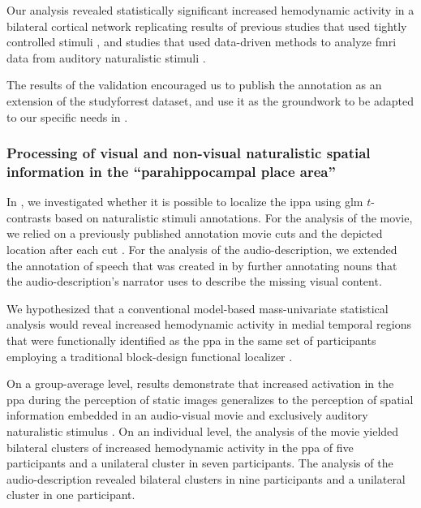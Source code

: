 
Our analysis revealed statistically significant increased hemodynamic activity
in a bilateral cortical network replicating results of previous studies that
used tightly controlled stimuli \citep[s.][for reviews]{friederici2011brain,
hickok2007cortical,price2012twentyyears}, and studies that used data-driven
methods to analyze \ac{fmri} data from auditory naturalistic stimuli
\citep{honey2012not, lerner2011topographic, silbert2014coupled}.

The results of the validation encouraged us to publish the annotation as an
extension of the studyforrest dataset, and use it as the groundwork to be
adapted to our specific needs in \citet{haeusler2022processing}.



\subsubsection{Processing of visual and non-visual naturalistic spatial
information in the ``parahippocampal place area''}


In \citet{haeusler2022processing}, we investigated whether it is possible to
localize the i\ac{ppa} using \ac{glm} $t$-contrasts based on naturalistic
stimuli annotations.
For the analysis of the movie, we relied on a previously published annotation
movie cuts and the depicted location after each cut \citep{haeusler2016cutanno}.
For the analysis of the audio-description, we extended the annotation of speech
that was created in \citet{haeusler2021speechanno} by further annotating nouns
that the audio-description's narrator uses to describe the missing visual
content.

We hypothesized that a conventional model-based mass-univariate statistical
analysis would reveal increased hemodynamic activity in medial temporal regions
that were functionally identified as the \ac{ppa} in the same set of
participants employing a traditional block-design functional localizer
\citep{sengupta2016extension}.



On a group-average level, results demonstrate that increased activation in the
\ac{ppa} during the perception of static images generalizes to the perception
of spatial information embedded in an audio-visual movie and exclusively
auditory naturalistic stimulus \citep{haeusler2022processing}.
On an individual level, the analysis of the movie yielded bilateral
clusters of increased hemodynamic activity in the \ac{ppa} of five participants
and a unilateral cluster in seven participants.
%
The analysis of the audio-description revealed bilateral clusters in nine
participants and a unilateral cluster in one participant.

